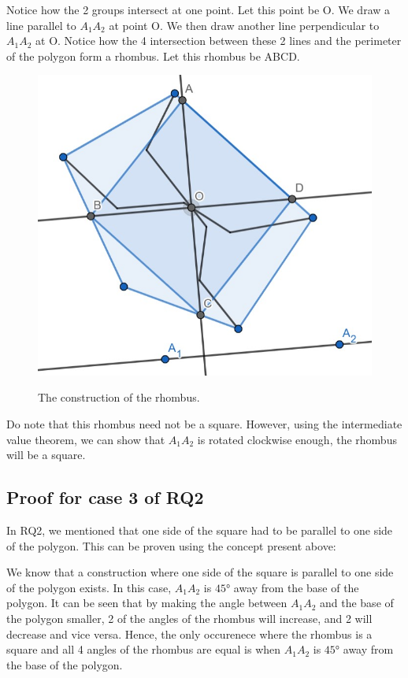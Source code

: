 \documentclass[12pt]{scrartcl}
\begin{document}
Notice how the 2 groups intersect at one point. Let this point be O. We draw a line parallel to $A_{1}A_{2}$ at point O. We then draw another line perpendicular to $A_{1}A_{2}$ at O. Notice how the 4 intersection between these 2 lines and the perimeter of the polygon form a rhombus. Let this rhombus be ABCD.

\begin{figure}[htpb]
	\centering
	\includegraphics[scale=.75]{images/rq3_1_4.jpg}
	\label{fig:rq3_1_4_img}
	\caption{The construction of the rhombus.}
\end{figure}

Do note that this rhombus need not be a square. However, using the intermediate value theorem, we can show that $A_{1}A_{2}$ is rotated clockwise enough, the rhombus will be a square.

\subsection{Proof for case 3 of RQ2}
In RQ2, we mentioned that one side of the square had to be parallel to one side of the polygon. This can be proven using the concept present above:

We know that a construction where one side of the square is parallel to one side of the polygon exists. In this case, $A_{1}A_{2}$ is $\ang{45}$ away from the base of the polygon. It can be seen that by making the angle between $A_{1}A_{2}$ and the base of the polygon smaller, 2 of the angles of the rhombus will increase, and 2 will decrease and vice versa. Hence, the only occurenece where the rhombus is a square and all 4 angles of the rhombus are equal is when $A_{1}A_{2}$ is $\ang{45}$ away from the base of the polygon.
\end{document}
